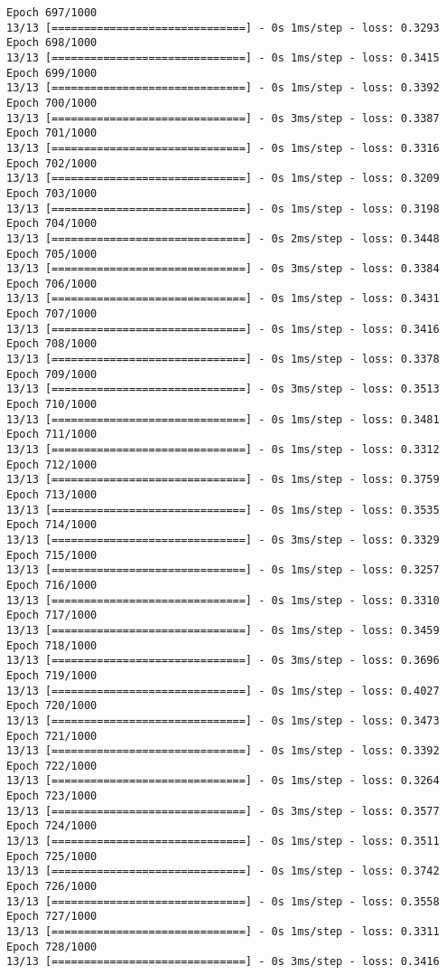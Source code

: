 \documentclass[11pt]{article}
\begin{document}
\begin{Verbatim}[commandchars=\\\{\}]
Epoch 697/1000
13/13 [==============================] - 0s 1ms/step - loss: 0.3293
Epoch 698/1000
13/13 [==============================] - 0s 1ms/step - loss: 0.3415
Epoch 699/1000
13/13 [==============================] - 0s 1ms/step - loss: 0.3392
Epoch 700/1000
13/13 [==============================] - 0s 3ms/step - loss: 0.3387
Epoch 701/1000
13/13 [==============================] - 0s 1ms/step - loss: 0.3316
Epoch 702/1000
13/13 [==============================] - 0s 1ms/step - loss: 0.3209
Epoch 703/1000
13/13 [==============================] - 0s 1ms/step - loss: 0.3198
Epoch 704/1000
13/13 [==============================] - 0s 2ms/step - loss: 0.3448
Epoch 705/1000
13/13 [==============================] - 0s 3ms/step - loss: 0.3384
Epoch 706/1000
13/13 [==============================] - 0s 1ms/step - loss: 0.3431
Epoch 707/1000
13/13 [==============================] - 0s 1ms/step - loss: 0.3416
Epoch 708/1000
13/13 [==============================] - 0s 1ms/step - loss: 0.3378
Epoch 709/1000
13/13 [==============================] - 0s 3ms/step - loss: 0.3513
Epoch 710/1000
13/13 [==============================] - 0s 1ms/step - loss: 0.3481
Epoch 711/1000
13/13 [==============================] - 0s 1ms/step - loss: 0.3312
Epoch 712/1000
13/13 [==============================] - 0s 1ms/step - loss: 0.3759
Epoch 713/1000
13/13 [==============================] - 0s 1ms/step - loss: 0.3535
Epoch 714/1000
13/13 [==============================] - 0s 3ms/step - loss: 0.3329
Epoch 715/1000
13/13 [==============================] - 0s 1ms/step - loss: 0.3257
Epoch 716/1000
13/13 [==============================] - 0s 1ms/step - loss: 0.3310
Epoch 717/1000
13/13 [==============================] - 0s 1ms/step - loss: 0.3459
Epoch 718/1000
13/13 [==============================] - 0s 3ms/step - loss: 0.3696
Epoch 719/1000
13/13 [==============================] - 0s 1ms/step - loss: 0.4027
Epoch 720/1000
13/13 [==============================] - 0s 1ms/step - loss: 0.3473
Epoch 721/1000
13/13 [==============================] - 0s 1ms/step - loss: 0.3392
Epoch 722/1000
13/13 [==============================] - 0s 1ms/step - loss: 0.3264
Epoch 723/1000
13/13 [==============================] - 0s 3ms/step - loss: 0.3577
Epoch 724/1000
13/13 [==============================] - 0s 1ms/step - loss: 0.3511
Epoch 725/1000
13/13 [==============================] - 0s 1ms/step - loss: 0.3742
Epoch 726/1000
13/13 [==============================] - 0s 1ms/step - loss: 0.3558
Epoch 727/1000
13/13 [==============================] - 0s 1ms/step - loss: 0.3311
Epoch 728/1000
13/13 [==============================] - 0s 3ms/step - loss: 0.3416

\end{Verbatim}
\end{document}
